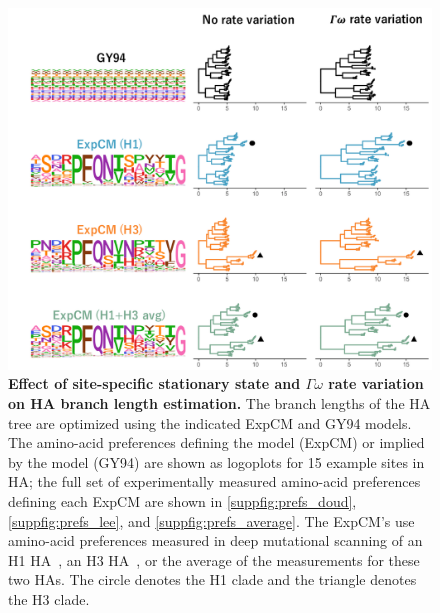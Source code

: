 \documentclass[11pt]{article}
\begin{document}
\begin{figure}
\centerline{\includegraphics[width=\textwidth]{figures/empirical_trees.pdf}}
\caption{\label{fig:empirical_trees}
\textbf{Effect of site-specific stationary state and $\Gamma\omega$ rate variation on HA branch length estimation.} 
The branch lengths of the HA tree are optimized using the indicated ExpCM and GY94 models. 
The amino-acid preferences defining the model (ExpCM) or implied by the model (GY94) are shown as logoplots for 15 example sites in HA; the full set of experimentally measured amino-acid preferences defining each ExpCM are shown in \ref{suppfig:prefs_doud}, \ref{suppfig:prefs_lee}, and \ref{suppfig:prefs_average}. 
The ExpCM's use amino-acid preferences measured in deep mutational scanning of an H1 HA~\citep{doud2016accurate}, an H3 HA~\citep{lee2018deep}, or the average of the measurements for these two HAs.
The circle denotes the H1 clade and the triangle denotes the H3 clade. 
}
\end{figure}
\end{document}
